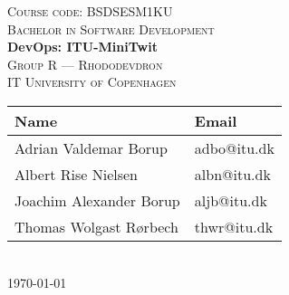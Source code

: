 \newcommand{\HRule}{\rule{1.25\linewidth}{0.5mm}}
\center
\vspace*{-4.35cm}
%
\vspace{3cm}
\textsc{\large Course code: BSDSESM1KU}
\\[0.2cm]
\textsc{\large Bachelor in Software Development}
\\[0.5cm]
\hbox{\makebox[1\textwidth][c]{\HRule}}
\vspace{0.4cm}
{ \huge \bfseries DevOps: ITU-MiniTwit}
\\[0.6cm]
\hbox{\makebox[1\textwidth][c]{\HRule}}
\vspace{0.9cm}
\textsc{\Large Group R --- Rhododevdron\\[0.5cm]IT University of Copenhagen}\\[1.5cm]
\begin{tabular}{ll}
\toprule
\textbf{Name} & \textbf{Email} \\
\midrule
Adrian Valdemar Borup & adbo@itu.dk \\
Albert Rise Nielsen & albn@itu.dk \\
Joachim Alexander Borup & aljb@itu.dk \\
Thomas Wolgast Rørbech & thwr@itu.dk \\
\bottomrule
\end{tabular}
\\[2cm]
{\large \today}
\vfill
